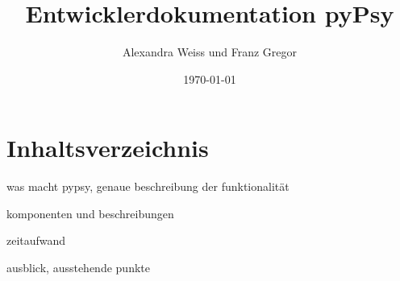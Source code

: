 \documentclass[a4paper,draft]{scrartcl}
\title{Entwicklerdokumentation pyPsy}
\author{Alexandra Weiss und Franz Gregor}
\date{\today}
\begin{document}
\maketitle
\newpage
\section{Inhaltsverzeichnis}
\item[was macht pypsy, genaue beschreibung der funktionalität]
\item[komponenten und beschreibungen]
\item[zeitaufwand]
\item[ausblick, ausstehende punkte]
\end{document}
